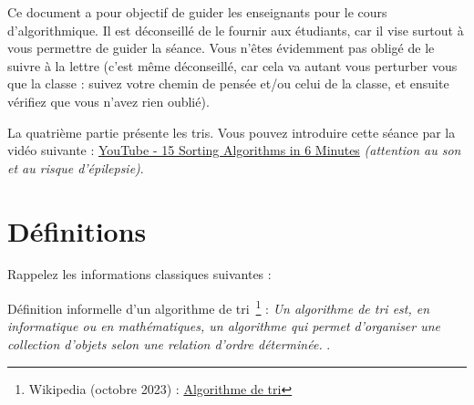 \documentclass[11pt,a4paper]{article}
\begin{document}
\EncadreTitre

\bigskip


%
%

\bigskip


Ce document a pour objectif de guider les enseignants pour le cours d'algorithmique.
Il est déconseillé de le fournir aux étudiants, car il vise surtout à vous permettre de guider la séance.
Vous n'êtes évidemment pas obligé de le suivre à la lettre (c'est même déconseillé, car cela va autant vous perturber vous que la classe : suivez votre chemin de pensée et/ou celui de la classe, et ensuite vérifiez que vous n'avez rien oublié).

\medskip

La quatrième partie présente les tris.
Vous pouvez introduire cette séance par la vidéo suivante : \href{https://www.youtube.com/watch?v=kPRA0W1kECg}{YouTube - 15 Sorting Algorithms in 6 Minutes} \textit{(attention au son et au risque d'épilepsie)}.

\bigskip


\section{Définitions}

Rappelez les informations classiques suivantes :

\bigskip

Définition informelle d'un algorithme de tri~\footnote{Wikipedia (octobre 2023) : \href{https://fr.wikipedia.org/wiki/Algorithme_de_tri}{Algorithme de tri}} : \og \textit{Un algorithme de tri est, en informatique ou en mathématiques, un algorithme qui permet d'organiser une collection d'objets selon une relation d'ordre déterminée.} \fg .
\end{document}

